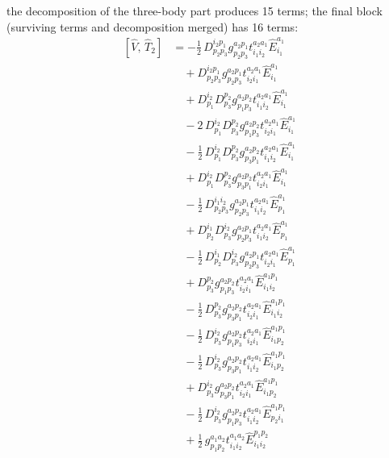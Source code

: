 \documentclass[11pt]{article}
\begin{document}
the decomposition of the three-body part produces 15 terms; the final block (surviving terms and decomposition merged) has 16 terms:
\begin{align}
\left[\hat{V},\, \hat{T}_{2}\right] &= - \tfrac{1}{2}\, D^{i_{2}p_{1}}_{p_{2}p_{3}} g^{a_{2}p_{1}}_{p_{2}p_{3}} t^{a_{2}a_{1}}_{i_{1}i_{2}} \hat{E}^{a_{1}}_{i_{1}} \\
&\quad + D^{i_{2}p_{1}}_{p_{2}p_{3}} g^{a_{2}p_{1}}_{p_{2}p_{3}} t^{a_{2}a_{1}}_{i_{2}i_{1}} \hat{E}^{a_{1}}_{i_{1}} \\
&\quad + D^{i_{2}}_{p_{1}} D^{p_{2}}_{p_{3}} g^{a_{2}p_{2}}_{p_{1}p_{3}} t^{a_{2}a_{1}}_{i_{1}i_{2}} \hat{E}^{a_{1}}_{i_{1}} \\
&\quad - 2\, D^{i_{2}}_{p_{1}} D^{p_{2}}_{p_{3}} g^{a_{2}p_{2}}_{p_{1}p_{3}} t^{a_{2}a_{1}}_{i_{2}i_{1}} \hat{E}^{a_{1}}_{i_{1}} \\
&\quad - \tfrac{1}{2}\, D^{i_{2}}_{p_{1}} D^{p_{2}}_{p_{3}} g^{a_{2}p_{2}}_{p_{3}p_{1}} t^{a_{2}a_{1}}_{i_{1}i_{2}} \hat{E}^{a_{1}}_{i_{1}} \\
&\quad + D^{i_{2}}_{p_{1}} D^{p_{2}}_{p_{3}} g^{a_{2}p_{2}}_{p_{3}p_{1}} t^{a_{2}a_{1}}_{i_{2}i_{1}} \hat{E}^{a_{1}}_{i_{1}} \\
&\quad - \tfrac{1}{2}\, D^{i_{1}i_{2}}_{p_{2}p_{3}} g^{a_{2}p_{1}}_{p_{2}p_{3}} t^{a_{2}a_{1}}_{i_{1}i_{2}} \hat{E}^{a_{1}}_{p_{1}} \\
&\quad + D^{i_{1}}_{p_{2}} D^{i_{2}}_{p_{3}} g^{a_{2}p_{1}}_{p_{2}p_{3}} t^{a_{2}a_{1}}_{i_{1}i_{2}} \hat{E}^{a_{1}}_{p_{1}} \\
&\quad - \tfrac{1}{2}\, D^{i_{1}}_{p_{2}} D^{i_{2}}_{p_{3}} g^{a_{2}p_{1}}_{p_{2}p_{3}} t^{a_{2}a_{1}}_{i_{2}i_{1}} \hat{E}^{a_{1}}_{p_{1}} \\
&\quad + D^{p_{2}}_{p_{3}} g^{a_{2}p_{2}}_{p_{1}p_{3}} t^{a_{2}a_{1}}_{i_{2}i_{1}} \hat{E}^{a_{1}p_{1}}_{i_{1}i_{2}} \\
&\quad - \tfrac{1}{2}\, D^{p_{2}}_{p_{3}} g^{a_{2}p_{2}}_{p_{3}p_{1}} t^{a_{2}a_{1}}_{i_{2}i_{1}} \hat{E}^{a_{1}p_{1}}_{i_{1}i_{2}} \\
&\quad - \tfrac{1}{2}\, D^{i_{2}}_{p_{3}} g^{a_{2}p_{2}}_{p_{1}p_{3}} t^{a_{2}a_{1}}_{i_{2}i_{1}} \hat{E}^{a_{1}p_{1}}_{i_{1}p_{2}} \\
&\quad - \tfrac{1}{2}\, D^{i_{2}}_{p_{3}} g^{a_{2}p_{2}}_{p_{3}p_{1}} t^{a_{2}a_{1}}_{i_{1}i_{2}} \hat{E}^{a_{1}p_{1}}_{i_{1}p_{2}} \\
&\quad + D^{i_{2}}_{p_{3}} g^{a_{2}p_{2}}_{p_{3}p_{1}} t^{a_{2}a_{1}}_{i_{2}i_{1}} \hat{E}^{a_{1}p_{1}}_{i_{1}p_{2}} \\
&\quad - \tfrac{1}{2}\, D^{i_{2}}_{p_{3}} g^{a_{2}p_{2}}_{p_{1}p_{3}} t^{a_{2}a_{1}}_{i_{1}i_{2}} \hat{E}^{a_{1}p_{1}}_{p_{2}i_{1}} \\
&\quad + \tfrac{1}{2}\, g^{a_{1}a_{2}}_{p_{1}p_{2}} t^{a_{1}a_{2}}_{i_{1}i_{2}} \hat{E}^{p_{1}p_{2}}_{i_{1}i_{2}}
\end{align}
\end{document}
